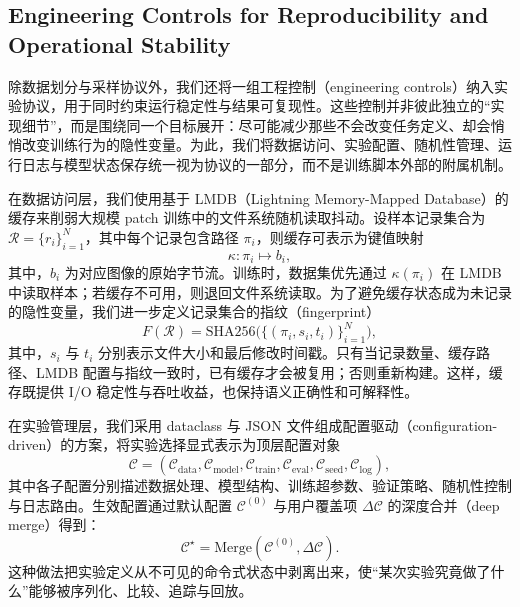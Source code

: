 \subsection{Engineering Controls for Reproducibility and Operational Stability}

除数据划分与采样协议外，我们还将一组工程控制（engineering controls）纳入实验协议，用于同时约束运行稳定性与结果可复现性。这些控制并非彼此独立的“实现细节”，而是围绕同一个目标展开：尽可能减少那些不会改变任务定义、却会悄悄改变训练行为的隐性变量。为此，我们将数据访问、实验配置、随机性管理、运行日志与模型状态保存统一视为协议的一部分，而不是训练脚本外部的附属机制。

在数据访问层，我们使用基于 LMDB（Lightning Memory-Mapped Database）的缓存来削弱大规模 patch 训练中的文件系统随机读取抖动。设样本记录集合为 $\mathcal{R}=\{r_i\}_{i=1}^{N}$，其中每个记录包含路径 $\pi_i$，则缓存可表示为键值映射
\begin{equation}
    \kappa : \pi_i \mapsto b_i,
\end{equation}
其中，$b_i$ 为对应图像的原始字节流。训练时，数据集优先通过 $\kappa(\pi_i)$ 在 LMDB 中读取样本；若缓存不可用，则退回文件系统读取。为了避免缓存状态成为未记录的隐性变量，我们进一步定义记录集合的指纹（fingerprint）
\begin{equation}
    F(\mathcal{R}) = \mathrm{SHA256}\bigl(\{(\pi_i, s_i, t_i)\}_{i=1}^{N}\bigr),
\end{equation}
其中，$s_i$ 与 $t_i$ 分别表示文件大小和最后修改时间戳。只有当记录数量、缓存路径、LMDB 配置与指纹一致时，已有缓存才会被复用；否则重新构建。这样，缓存既提供 I/O 稳定性与吞吐收益，也保持语义正确性和可解释性。

在实验管理层，我们采用 dataclass 与 JSON 文件组成配置驱动（configuration-driven）的方案，将实验选择显式表示为顶层配置对象
\begin{equation}
    \mathcal{C} = (\mathcal{C}_{\mathrm{data}}, \mathcal{C}_{\mathrm{model}}, \mathcal{C}_{\mathrm{train}}, \mathcal{C}_{\mathrm{eval}}, \mathcal{C}_{\mathrm{seed}}, \mathcal{C}_{\mathrm{log}}),
\end{equation}
其中各子配置分别描述数据处理、模型结构、训练超参数、验证策略、随机性控制与日志路由。生效配置通过默认配置 $\mathcal{C}^{(0)}$ 与用户覆盖项 $\Delta \mathcal{C}$ 的深度合并（deep merge）得到：
\begin{equation}
    \mathcal{C}^{\star} = \mathrm{Merge}(\mathcal{C}^{(0)}, \Delta \mathcal{C}).
\end{equation}
这种做法把实验定义从不可见的命令式状态中剥离出来，使“某次实验究竟做了什么”能够被序列化、比较、追踪与回放。

